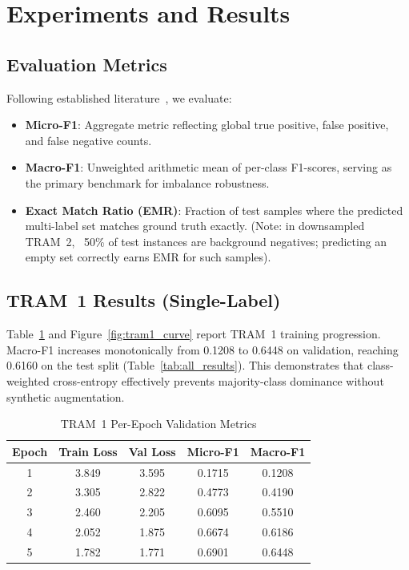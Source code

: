 \documentclass[runningheads]{llncs}
\begin{document}
\section{Experiments and Results}
\label{sec:experiments}

\subsection{Evaluation Metrics}
Following established literature~\cite{li2024automated,albarrak2025acmapper,tsoumakas2007multilabel}, we evaluate:
\begin{itemize}
  \item \textbf{Micro-F1}: Aggregate metric reflecting global true positive, false positive, and false negative counts.
  \item \textbf{Macro-F1}: Unweighted arithmetic mean of per-class F1-scores, serving as the primary benchmark for imbalance robustness.
  \item \textbf{Exact Match Ratio (EMR)}: Fraction of test samples where the predicted multi-label set matches ground truth exactly. (Note: in downsampled TRAM~2, ~50\% of test instances are background negatives; predicting an empty set correctly earns EMR for such samples).
\end{itemize}

\subsection{TRAM~1 Results (Single-Label)}
Table~\ref{tab:tram1_epochs} and Figure~\ref{fig:tram1_curve} report TRAM~1 training progression. Macro-F1 increases monotonically from 0.1208 to 0.6448 on validation, reaching 0.6160 on the test split (Table~\ref{tab:all_results}). This demonstrates that class-weighted cross-entropy effectively prevents majority-class dominance without synthetic augmentation.

\begin{table}[t]
\caption{TRAM~1 Per-Epoch Validation Metrics}
\label{tab:tram1_epochs}
\centering
\begin{tabular}{ccccc}
\toprule
Epoch & Train Loss & Val Loss & Micro-F1 & Macro-F1 \\
\midrule
1 & 3.849 & 3.595 & 0.1715 & 0.1208 \\
2 & 3.305 & 2.822 & 0.4773 & 0.4190 \\
3 & 2.460 & 2.205 & 0.6095 & 0.5510 \\
4 & 2.052 & 1.875 & 0.6674 & 0.6186 \\
5 & 1.782 & 1.771 & 0.6901 & 0.6448 \\
\bottomrule
\end{tabular}
\end{table}
\end{document}
